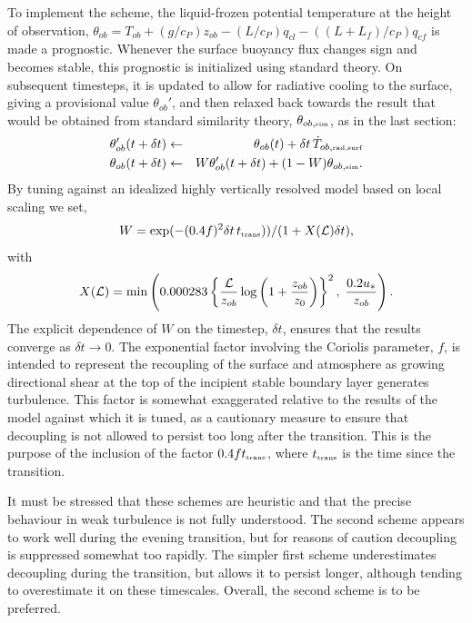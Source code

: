 \documentclass{UMDP_article}
\begin{document}
To implement the scheme, the liquid-frozen potential temperature at
the height of observation, $\theta_{ob}=T_{ob}+(g/c_P)z_{ob}-(L/c_P)
q_{cl} - ((L+L_f)/c_P) q_{cf}$ is made a prognostic. Whenever the
surface buoyancy flux changes sign and becomes stable, this prognostic
is initialized using standard theory. On subsequent timesteps, it is
updated to allow for radiative cooling to the surface, giving a
provisional value $\theta_{ob}'$, and then relaxed back towards the
result that would be obtained from standard similarity theory,
$\theta_{ob, \mbox{\tiny sim}}$, as in the last section:
\begin{eqnarray}
  \theta_{ob}'(t+\delta t) &\leftarrow & \theta_{ob}(t)+
  \delta t \, \dot T_{ob,\mbox{\tiny rad,surf}} \\
  \theta_{ob}(t+\delta t) &\leftarrow & W \theta_{ob}'(t+\delta t)
  +(1-W) \theta_{ob, \mbox{\tiny sim}}.
\end{eqnarray}
By tuning against an idealized highly vertically resolved model based
on local scaling we set,
\begin{equation}
  W = \exp(-(0.4 f)^2 \delta t \, t_{\mbox{\tiny trans}})) /
  (1+X({\cal L})\delta t),
\end{equation}
with 
\begin{equation}
  X({\cal L})= \min \left (  0.000283  \left \{\frac{{\cal L}}{z_{ob}}
      \log \left (1+\frac{z_{ob}}{z_0}\right ) \right \}^2,
    \; \frac{0.2 u_* }{z_{ob}} \right ).
\end{equation}
The explicit dependence of $W$ on the timestep, $\delta t$, ensures
that the results converge as $\delta t \rightarrow 0$. The exponential
factor involving the Coriolis parameter, $f$, is intended to represent
the recoupling of the surface and atmosphere as growing directional
shear at the top of the incipient stable boundary layer generates
turbulence. This factor is somewhat exaggerated relative to the
results of the model against which it is tuned, as a cautionary
measure to ensure that decoupling is not allowed to persist too long
after the transition. This is the purpose of the inclusion of the
factor $0.4 f t_{\mbox{\tiny trans}}$, where $t_{\mbox{\tiny trans}}$
is the time since the transition.

It must be stressed that these schemes are heuristic and that the
precise behaviour in weak turbulence is not fully understood. The
second scheme appears to work well during the evening transition, but
for reasons of caution decoupling is suppressed somewhat too
rapidly. The simpler first scheme underestimates decoupling during the
transition, but allows it to persist longer, although tending to
overestimate it on these timescales. Overall, the second scheme is to
be preferred.
\end{document}
